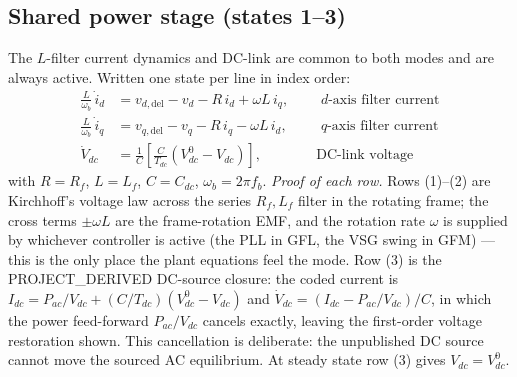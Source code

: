 \documentclass[12pt,a4paper]{article}
\begin{document}
\subsection{Shared power stage (states 1--3)}
The $L$-filter current dynamics and DC-link are common to both modes and are
always active. Written one state per line in index order:
\begin{align}
  \tfrac{L}{\omega_b}\,\dot{i}_d &= v_{d,\mathrm{del}}-v_d-R\,i_d+\omega L\,i_q,
    &&\text{ $d$-axis filter current}\\
  \tfrac{L}{\omega_b}\,\dot{i}_q &= v_{q,\mathrm{del}}-v_q-R\,i_q-\omega L\,i_d,
    &&\text{ $q$-axis filter current}\\
  \dot{V}_{dc} &= \tfrac{1}{C}\!\left[\tfrac{C}{T_{dc}}(V_{dc}^{0}-V_{dc})\right],
    &&\text{ DC-link voltage}
\end{align}
with $R=R_f$, $L=L_f$, $C=C_{dc}$, $\omega_b=2\pi f_b$. \emph{Proof of each row.}
Rows (1)--(2) are Kirchhoff's voltage law across the series $R_f,L_f$ filter in
the rotating frame; the cross terms $\pm\omega L$ are the frame-rotation EMF, and
the rotation rate $\omega$ is supplied by whichever controller is active (the PLL
in GFL, the VSG swing in GFM) --- this is the only place the plant equations feel
the mode. Row (3) is the \textsf{PROJECT\_DERIVED} DC-source closure: the coded
current is $I_{dc}=P_{ac}/V_{dc}+(C/T_{dc})(V_{dc}^{0}-V_{dc})$ and
$\dot V_{dc}=(I_{dc}-P_{ac}/V_{dc})/C$, in which the power feed-forward
$P_{ac}/V_{dc}$ cancels exactly, leaving the first-order voltage restoration
shown. This cancellation is deliberate: the unpublished DC source cannot move the
sourced AC equilibrium. At steady state row (3) gives $V_{dc}=V_{dc}^{0}$.
\end{document}
